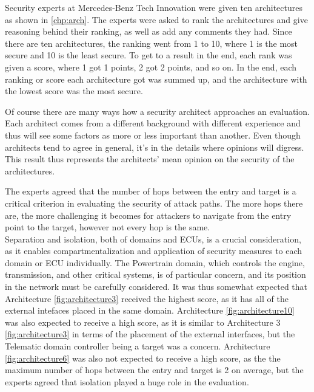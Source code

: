 Security experts at Mercedes-Benz Tech Innovation were given ten architectures as shown in \ref{chp:arch}.
The experts were asked to rank the architectures and give reasoning behind their ranking, as well as add any comments they had.
Since there are ten architectures, the ranking went from 1 to 10, where 1 is the most secure and 10 is the least secure.
To get to a result in the end, each rank was given a score, where 1 got 1 points, 2 got 2 points, and so on.
In the end, each ranking or score each architecture got was summed up, and the architecture with the lowest score was the most secure.

Of course there are many ways how a security architect approaches an evaluation.
Each architect comes from a different background with different experience and thus will see some factors as more or less important than another.
Even though architects tend to agree in general, it's in the details where opinions will digress.
This result thus represents the architects' mean opinion on the security of the architectures. 

The experts agreed that the number of hops between the entry and target is a critical criterion in evaluating the security of attack paths. 
The more hops there are, the more challenging it becomes for attackers to navigate from the entry point to the target, however not every hop is the same.\\

Separation and isolation, both of domains and ECUs, is a crucial consideration, as it enables compartmentalization and application of security measures to each domain or ECU individually. 
The Powertrain domain, which controls the engine, transmission, and other critical systems, is of particular concern, and its position in the network must be carefully considered. 
It was thus somewhat expected that Architecture \ref{fig:architecture3} received the highest score, as it has all of the external intefaces placed in the same domain.
Architecture \ref{fig:architecture10} was also expected to receive a high score, as it is similar to Architecture 3 \ref{fig:architecture3} in terms of the placement of the external interfaces,
but the Telematic domain controller being a target was a concern.
Architecture \ref{fig:architecture6} was also not expected to receive a high score, as the the maximum number of hops between the entry and target is 2 on average,
but the experts agreed that isolation played a huge role in the evaluation.\\

